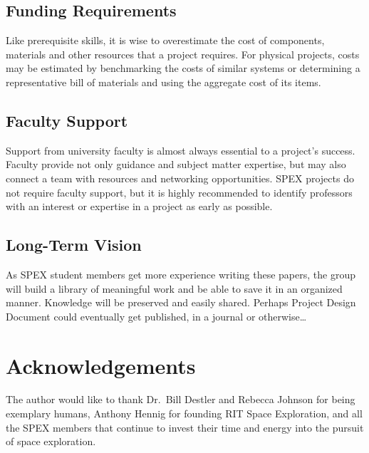 \documentclass[conference]{IEEEtran} %
\begin{document}
\subsection{Funding Requirements}
Like prerequisite skills, it is wise to overestimate the cost of components, materials and other resources that a project requires.
For physical projects, costs may be estimated by benchmarking the costs of similar systems or determining a representative bill of materials and using the aggregate cost of its items.

\subsection{Faculty Support}
Support from university faculty is almost always essential to a project's success.
Faculty provide not only guidance and subject matter expertise, but may also connect a team with resources and networking opportunities.
SPEX projects do not require faculty support, but it is highly recommended to identify professors with an interest or expertise in a project as early as possible.

\subsection{Long-Term Vision}
\label{sec:vision}
As SPEX student members get more experience writing these papers, the group will build a library of meaningful work and be able to save it in an organized manner.
Knowledge will be preserved and easily shared.
Perhaps Project Design Document could eventually get published, in a journal or otherwise\ldots

\section*{Acknowledgements}
The author would like to thank Dr.~Bill Destler and Rebecca Johnson for being exemplary humans, Anthony Hennig for founding RIT Space Exploration, and all the SPEX members that continue to invest their time and energy into the pursuit of space exploration.



\end{document}
